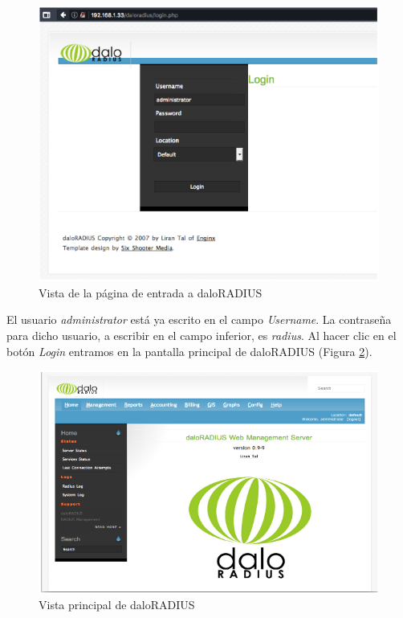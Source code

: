 \begin{figure}[!t]
\begin{center}
\includegraphics[width=0.75\linewidth]{./5_AnalisisOrganico/Img/daloLogin.png}
\end{center}
\caption{Vista de la página de entrada a daloRADIUS}
\label{daloLogin}
\end{figure}

El usuario \emph{administrator} está ya escrito en el campo \emph{Username}. La contraseña para dicho usuario, a escribir en el campo inferior, es \emph{radius}. Al hacer clic en el botón \emph{Login} entramos en la pantalla principal de daloRADIUS (Figura \ref{daloMain}).

\begin{figure}[!t]
\begin{center}
\includegraphics[width=0.75\linewidth]{./5_AnalisisOrganico/Img/daloMain.png}
\end{center}
\caption{Vista principal de daloRADIUS}
\label{daloMain}
\end{figure}


